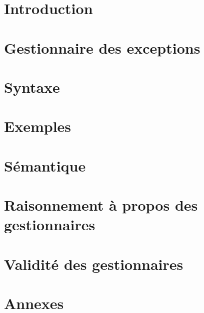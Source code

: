 \documentclass[10pt,a4paper]{article}
\begin{document}
\maketitle
\tableofcontents
\newpage


\section*{Introduction}



\section{Gestionnaire des exceptions}



\section{Syntaxe}


\newpage
\section{Exemples}


\section{Sémantique}


\section{Raisonnement à propos des gestionnaires}


\section{Validité des gestionnaires}



\newpage


\newpage
\section*{Annexes}



\appendix

%
\end{document}
